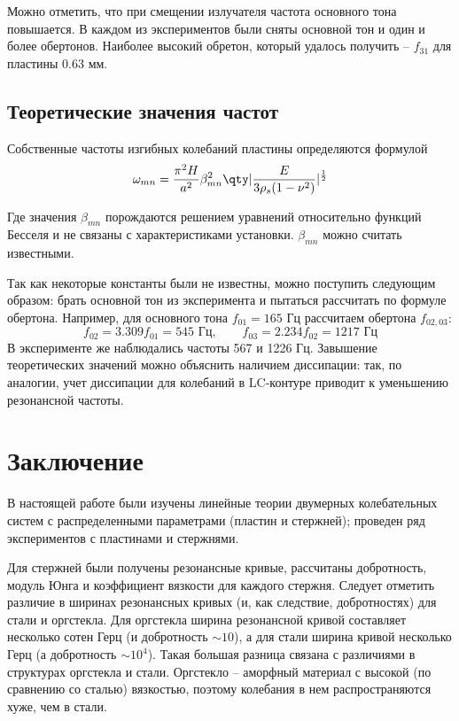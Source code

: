 \documentclass[a4paper,14pt]{extarticle}
\begin{document}
Можно отметить, что при смещении излучателя частота основного тона повышается. В каждом из экспериментов были сняты основной тон и один и более обертонов. Наиболее высокий обретон, который удалось получить -- $f_{31}$ для пластины 0.63 мм.

\subsection{Теоретические значения частот}
Собственные частоты изгибных колебаний пластины определяются формулой
\begin{equation}
	\omega_{mn} = \frac{\pi^2 H}{a^2}\beta_{mn}^2 \qty|\frac{E}{3\rho_s (1-\nu^2)}|^{\frac12}
\end{equation}

Где значения $\beta_{mn}$ порождаются решением уравнений относительно функций Бесселя и не связаны с характеристиками установки. $\beta_{mn}$ можно считать известными.

Так как некоторые константы были не известны, можно поступить следующим образом: брать основной тон из эксперимента и пытаться рассчитать по формуле обертона. Например, для основного тона $f_{01}=165$ Гц рассчитаем обертона $f_{02,03}$:
\begin{equation}
	f_{02} = 3.309 f_{01} = 545 \text{ Гц},\qquad 
	f_{03} = 2.234 f_{02} = 1217 \text{ Гц} 
\end{equation}
В эксперименте же наблюдались частоты 567 и 1226 Гц. Завышение теоретических значений можно объяснить наличием диссипации: так, по аналогии, учет диссипации для колебаний в LC-контуре приводит к уменьшению резонансной частоты.
\newpage
{}
\section*{Заключение}
В настоящей работе были изучены линейные теории двумерных колебательных систем с распределенными параметрами (пластин и стержней); проведен ряд экспериментов с пластинами и стержнями. 

Для стержней были получены резонансные кривые, рассчитаны добротность, модуль Юнга и коэффициент вязкости для каждого стержня. Следует отметить различие в ширинах резонансных кривых (и, как следствие, добротностях) для стали и оргстекла. Для оргстекла ширина резонансной кривой составляет несколько сотен Герц (и добротность $\sim10$), а для стали ширина кривой несколько Герц (а добротность $\sim 10^4$). Такая большая разница связана с различиями в структурах оргстекла и стали. Оргстекло -- аморфный материал с высокой (по сравнению со сталью) вязкостью, поэтому колебания в нем распространяются хуже, чем в стали. 
\end{document}

